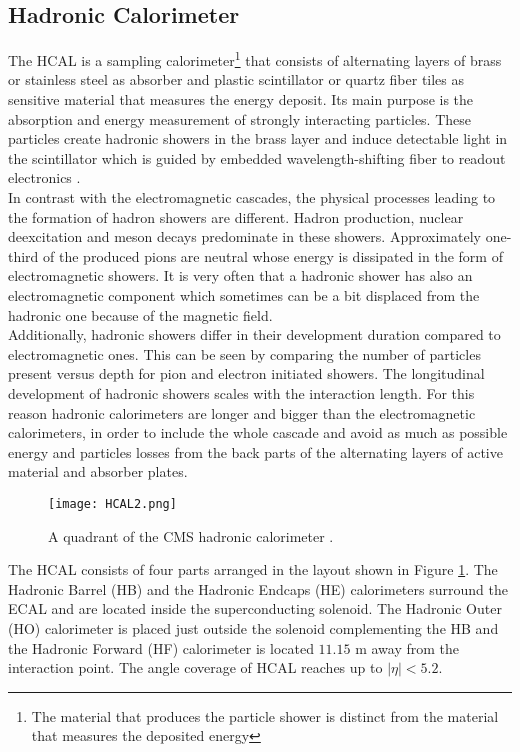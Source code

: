 \subsection{\label{sec:exp_CMS_3}Hadronic Calorimeter}
The HCAL \cite{HCAL} is a sampling calorimeter\footnote{The material that produces the particle shower is distinct from the material that measures the deposited energy} that consists of alternating layers of brass or stainless steel as absorber and plastic scintillator or quartz fiber tiles as sensitive material that measures the energy deposit. Its main purpose is the absorption and energy measurement of strongly interacting particles. These particles create hadronic showers in the brass layer and induce detectable light in the scintillator which is guided by embedded wavelength-shifting fiber to readout electronics \cite{CERN:HCAL,Mans:1481837}.\\
\indent In contrast with the electromagnetic cascades, the physical processes leading to the formation of hadron showers are different. Hadron production, nuclear deexcitation and meson decays predominate in these showers. Approximately one-third of the produced pions are neutral whose energy is dissipated in the form of electromagnetic showers. It is very often that a hadronic shower has also an electromagnetic component which sometimes can be a bit displaced from the hadronic one because of the magnetic field.\\
\indent Additionally, hadronic showers differ in their development duration compared to electromagnetic ones. This can be seen by comparing the number of particles present versus depth for pion and electron initiated showers. The longitudinal development of hadronic showers scales with the interaction length. For this reason hadronic calorimeters are longer and bigger than the electromagnetic calorimeters, in order to include the whole cascade and avoid as much as possible energy and particles losses from the back parts of the alternating layers of active material and absorber plates.
\begin{figure}[H]
    \centering
    \texttt{[image: HCAL2.png]}
    \caption{A quadrant of the CMS hadronic calorimeter \cite{Hayrapetyan:2870088}.}
    \label{fig:HCAL}
\end{figure}
\indent The HCAL consists of four parts arranged in the layout shown in Figure \ref{fig:HCAL}. The Hadronic Barrel (HB) and the Hadronic Endcaps (HE) calorimeters surround the ECAL and are located inside the superconducting solenoid. The Hadronic Outer (HO) calorimeter is placed just outside the solenoid complementing the HB and the Hadronic Forward (HF) calorimeter is located $11.15$ m away from the interaction point. The angle coverage of HCAL reaches up to $|\eta| < 5.2$. \\
